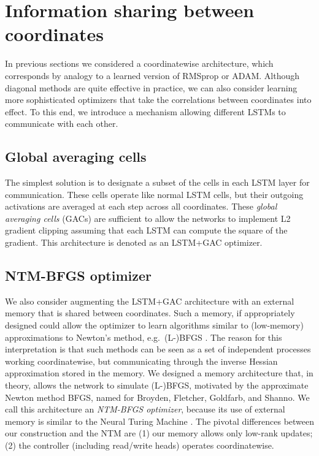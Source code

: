 \section{Information sharing between coordinates}
\label{sec:ntm}

In previous sections we considered a coordinatewise architecture, which
corresponds by analogy to a learned version of RMSprop or ADAM.  Although
diagonal methods are quite effective in practice, we can also consider learning
more sophisticated optimizers that take the correlations between coordinates
into effect. To this end, we introduce a mechanism allowing different LSTMs to
communicate with each other.

\subsection*{Global averaging cells}

The simplest solution is to designate a subset of the cells in each LSTM layer
for communication. These cells operate like normal LSTM cells, but their
outgoing activations are averaged at each step across all coordinates.  These
\emph{global averaging cells} (GACs) are sufficient to allow the networks to
implement L2 gradient clipping \citep{bengio:2013} assuming that each LSTM can
compute the square of the gradient. This architecture is denoted as an LSTM+GAC
optimizer.

\subsection*{NTM-BFGS optimizer}

We also consider augmenting the LSTM+GAC architecture with an external memory
that is shared between coordinates. Such a memory, if appropriately designed
could allow the optimizer to learn algorithms similar to (low-memory)
approximations to Newton's method, e.g.\ (L-)BFGS \citep[see][]{nocedal:2006}.
The reason for this interpretation is that such methods can be seen as a set of
independent processes working coordinatewise, but communicating through the
inverse Hessian approximation stored in the memory.  We designed a memory
architecture that, in theory, allows the network to simulate (L-)BFGS,
motivated by the approximate Newton method BFGS, named for Broyden, Fletcher,
Goldfarb, and Shanno.  We call this architecture an \emph{NTM-BFGS optimizer},
because its use of external memory is similar to the Neural Turing Machine
\citep{graves:2014}.  The pivotal differences between our construction and the
NTM are (1) our memory allows only low-rank updates; (2) the controller
(including read/write heads) operates coordinatewise.

